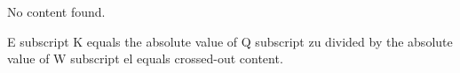 No content found.

E subscript K equals the absolute value of Q subscript zu divided by the absolute value of W subscript el equals crossed-out content.